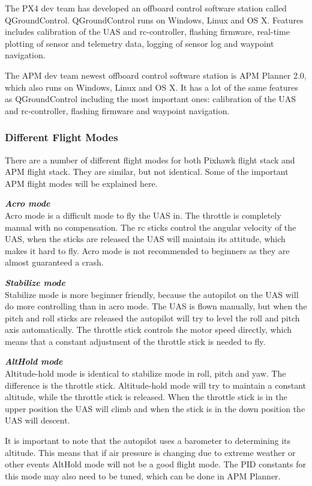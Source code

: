 The PX4 dev team has developed an offboard control software station called QGroundControl. QGroundControl runs on Windows, Linux and OS X. Features includes calibration of the UAS and rc-controller, flashing firmware, real-time plotting of sensor and telemetry data, logging of sensor log and waypoint navigation. 

The APM dev team newest offboard control software station is APM Planner 2.0, which also runs on Windows, Linux and OS X. It has a lot of the same features as QGroundControl including the most important ones: calibration of the UAS and rc-controller, flashing firmware and waypoint navigation.

\subsubsection{Different Flight Modes}
There are a number of different flight modes for both Pixhawk flight stack and APM flight stack. They are similar, but not identical. Some of the important APM flight modes will be explained here. 

\emph{\textbf{Acro mode}}\\
Acro mode is a difficult mode to fly the UAS in. The throttle is completely manual with no compensation. The rc sticks control the angular velocity of the UAS, when the sticks are released the UAS will maintain its attitude, which makes it hard to fly. Acro mode is not recommended to beginners as they are almost guaranteed a crash.

\emph{\textbf{Stabilize mode}}\\
Stabilize mode is more beginner friendly, because the autopilot on the UAS will do more controlling than in acro mode. The UAS is flown manually, but when the pitch and roll sticks are released the autopilot will try to level the roll and pitch axis automatically. The throttle stick controls the motor speed directly, which means that a constant adjustment of the throttle stick is needed to fly.

\emph{\textbf{AltHold mode}}\\
Altitude-hold mode is identical to stabilize mode in roll, pitch and yaw. The difference is the throttle stick. Altitude-hold mode will try to maintain a constant altitude, while the throttle stick is released. When the throttle stick is in the upper position the UAS will climb and when the stick is in the down position the UAS will descent. 

It is important to note that the autopilot uses a barometer to determining its altitude. This means that if air pressure is changing due to extreme weather or other events AltHold mode will not be a good flight mode. The PID constants for this mode may also need to be tuned, which can be done in APM Planner.

